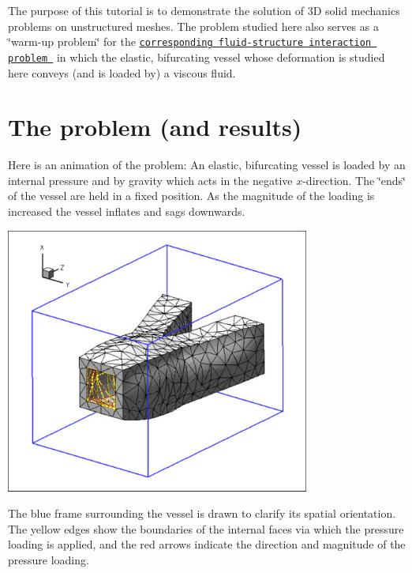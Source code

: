 The purpose of this tutorial is to demonstrate the solution of 3D solid mechanics problems on unstructured meshes. The problem studied here also serves as a \char`\"{}warm-\/up problem\char`\"{} for the \href{../../../interaction/unstructured_three_d_fsi/html/index.html}{\tt corresponding fluid-\/structure interaction problem } in which the elastic, bifurcating vessel whose deformation is studied here conveys (and is loaded by) a viscous fluid.



 

\hypertarget{index_problem}{}\section{The problem (and results)}\label{index_problem}
Here is an animation of the problem\+: An elastic, bifurcating vessel is loaded by an internal pressure and by gravity which acts in the negative $x$-\/direction. The \char`\"{}ends\char`\"{} of the vessel are held in a fixed position. As the magnitude of the loading is increased the vessel inflates and sags downwards.

 
\begin{DoxyImage}
\includegraphics[width=0.75\textwidth]{deform}
\end{DoxyImage}


The blue frame surrounding the vessel is drawn to clarify its spatial orientation. The yellow edges show the boundaries of the internal faces via which the pressure loading is applied, and the red arrows indicate the direction and magnitude of the pressure loading.



